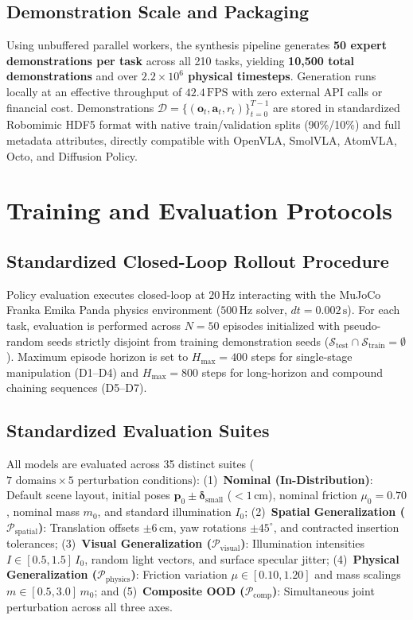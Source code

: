 \documentclass[conference]{IEEEtran}
\begin{document}
\subsection{Demonstration Scale and Packaging}
Using unbuffered parallel workers, the synthesis pipeline generates \textbf{50 expert demonstrations per task} across all 210 tasks, yielding \textbf{10,500 total demonstrations} and over \textbf{$2.2 \times 10^6$ physical timesteps}. Generation runs locally at an effective throughput of $42.4\,\text{FPS}$ with zero external API calls or financial cost. Demonstrations $\mathcal{D} = \{(\mathbf{o}_t, \mathbf{a}_t, r_t)\}_{t=0}^{T-1}$ are stored in standardized Robomimic HDF5 format with native train/validation splits (90\%/10\%) and full metadata attributes, directly compatible with OpenVLA, SmolVLA, AtomVLA, Octo, and Diffusion Policy.

\section{Training and Evaluation Protocols}
\label{sec:protocols}

\subsection{Standardized Closed-Loop Rollout Procedure}
Policy evaluation executes closed-loop at $20\,\text{Hz}$ interacting with the MuJoCo Franka Emika Panda physics environment ($500\,\text{Hz}$ solver, $dt=0.002\,\text{s}$). For each task, evaluation is performed across $N=50$ episodes initialized with pseudo-random seeds strictly disjoint from training demonstration seeds ($\mathcal{S}_{\text{test}} \cap \mathcal{S}_{\text{train}} = \emptyset$). Maximum episode horizon is set to $H_{\max}=400$ steps for single-stage manipulation (D1--D4) and $H_{\max}=800$ steps for long-horizon and compound chaining sequences (D5--D7).

\subsection{Standardized Evaluation Suites}
All models are evaluated across 35 distinct suites ($7 \text{ domains} \times 5 \text{ perturbation conditions}$): (1)~\textbf{Nominal (In-Distribution)}: Default scene layout, initial poses $\mathbf{p}_0 \pm \boldsymbol{\delta}_{\text{small}}$ ($<1\,\text{cm}$), nominal friction $\mu_0 = 0.70$, nominal mass $m_0$, and standard illumination $I_0$; (2)~\textbf{Spatial Generalization ($\mathcal{P}_{\mathrm{spatial}}$)}: Translation offsets $\pm 6\,\text{cm}$, yaw rotations $\pm 45^\circ$, and contracted insertion tolerances; (3)~\textbf{Visual Generalization ($\mathcal{P}_{\mathrm{visual}}$)}: Illumination intensities $I \in [0.5, 1.5]\,I_0$, random light vectors, and surface specular jitter; (4)~\textbf{Physical Generalization ($\mathcal{P}_{\mathrm{physics}}$)}: Friction variation $\mu \in [0.10, 1.20]$ and mass scalings $m \in [0.5, 3.0]\,m_0$; and (5)~\textbf{Composite OOD ($\mathcal{P}_{\mathrm{comp}}$)}: Simultaneous joint perturbation across all three axes.
\end{document}
